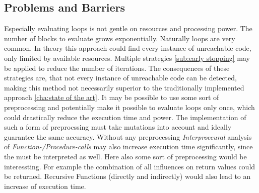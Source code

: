 \subsection{Problems and Barriers}
\label{sub:problems and barriers}
Especially evaluating loops is not gentle on resources and processing power. The number of blocks to evaluate grows exponentially. Naturally loops are very common. In theory this approach could find every instance of unreachable code, only limited by available resources. Multiple strategies \ref{sub:early stopping}  may be applied to reduce the number of iterations.
The consequences of these strategies are, that not every instance of unreachable code can be detected, making this method not necessarily superior to the traditionally implemented approach \ref{cha:state of the art}. 
It may be possible to use some sort of preprocessing and potentially make it possible to evaluate loops only once, which could drastically reduce the execution time and power.
The implementation of such a form of preprocssing must take mutations into account and ideally guarantee the same accuracy.
Without any preprocessing \emph{Interproecural} analysis of \emph{Function-/Procedure-calls} may also increase execution time significantly, since the must be interpreted as well. Here also some sort of preprocessing would be interessting. For example the combination of all influences on return values could be returned. 
Recursive Functions (directly and indirectly) would also lead to an increase of execution time.
